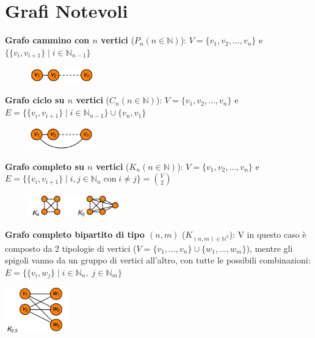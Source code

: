\section{Grafi Notevoli}
\begin{flushleft}

    \textbf{Grafo cammino con $n$ vertici} ($P_n (n \in \mathbb{N})$): $V = \{v_1, v_2, ..., v_n\}$ e $\{\{v_i, v_{i+1}\} \; | \; i \in \mathbb{N}_{n-1}\}$

    \begin{figure}[h]
        \centering
        \includegraphics[width=0.25\textwidth]{img/grafo_cammino}
    \end{figure}

    \textbf{Grafo ciclo su $n$ vertici} ($C_n (n \in \mathbb{N})$): $V = \{v_1, v_2, ..., v_n\}$ e $E = \{\{v_i, v_{i+1}\} \; | \; i \in \mathbb{N}_{n-1}\} \cup \{v_n, v_1\}$
    
    \begin{figure}[h]
        \centering
        \includegraphics[width=0.25\textwidth]{img/grafo_ciclo}
    \end{figure}

    \textbf{Grafo completo su $n$ vertici} ($K_n (n \in \mathbb{N})$): $V = \{v_1, v_2, ..., v_n\}$ e $E = \{\{v_i, v_{i+1}\} \; | \; i, j \in \mathbb{N}_n \; \text{con} \; i \neq j\} = \binom{V}{2}$

    \begin{figure}[h]
        \centering
        \includegraphics[width=0.35\textwidth]{img/grafo_completo}
    \end{figure}

    \textbf{Grafo completo bipartito di tipo $(n, m)$} ($K_{(n, m) \in \mathbb{N}^2}$): V in questo caso è composto da 2 tipologie di vertici ($V = \{v_1, ..., v_n\} \cup \{w_1, ..., w_m\}$), mentre gli spigoli vanno da un gruppo di vertici all'altro, con tutte le possibili combinazioni: $E = \{\{v_i, w_j\} \; | \; i \in \mathbb{N}_n, \; j \in \mathbb{N}_m\}$

    \begin{center}
        \includegraphics[width=0.2\textwidth]{img/grafo_com_bip}
    \end{center}
\end{flushleft}

